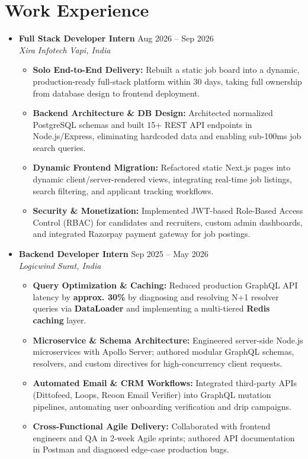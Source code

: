 \documentclass[10pt]{article}
\newcommand{\experienceHeader}[4]{
  \item \textbf{#1} \hfill #2 \\
  \textit{#3} \hfill \textit{#4}
}
\newcommand{\subListStart}{\begin{itemize}[leftmargin=0.18in, nosep, topsep=1pt]}
\newcommand{\subListEnd}{\end{itemize}\vspace{2pt}}
\begin{document}
\section{Work Experience}
\begin{itemize}[label={}, leftmargin=0pt]

  \experienceHeader{Full Stack Developer Intern}{Aug 2026 -- Sep 2026}{Xira Infotech}{Vapi, India}
  \subListStart
    \item \textbf{Solo End-to-End Delivery:} Rebuilt a static job board into a dynamic, production-ready full-stack platform within 30 days, taking full ownership from database design to frontend deployment.
    \item \textbf{Backend Architecture \& DB Design:} Architected normalized PostgreSQL schemas and built 15+ REST API endpoints in Node.js/Express, eliminating hardcoded data and enabling sub-100ms job search queries.
    \item \textbf{Dynamic Frontend Migration:} Refactored static Next.js pages into dynamic client/server-rendered views, integrating real-time job listings, search filtering, and applicant tracking workflows.
    \item \textbf{Security \& Monetization:} Implemented JWT-based Role-Based Access Control (RBAC) for candidates and recruiters, custom admin dashboards, and integrated Razorpay payment gateway for job postings.
  \subListEnd

  \experienceHeader{Backend Developer Intern}{Sep 2025 -- May 2026}{Logicwind}{Surat, India}
  \subListStart
    \item \textbf{Query Optimization \& Caching:} Reduced production GraphQL API latency by \textbf{approx. 30\%} by diagnosing and resolving N+1 resolver queries via \textbf{DataLoader} and implementing a multi-tiered \textbf{Redis caching} layer.
    \item \textbf{Microservice & Schema Architecture:} Engineered server-side Node.js microservices with Apollo Server; authored modular GraphQL schemas, resolvers, and custom directives for high-concurrency client requests.
    \item \textbf{Automated Email \& CRM Workflows:} Integrated third-party APIs (Dittofeed, Loops, Reoon Email Verifier) into GraphQL mutation pipelines, automating user onboarding verification and drip campaigns.
    \item \textbf{Cross-Functional Agile Delivery:} Collaborated with frontend engineers and QA in 2-week Agile sprints; authored API documentation in Postman and diagnosed edge-case production bugs.
  \subListEnd

\end{itemize}
\end{document}
